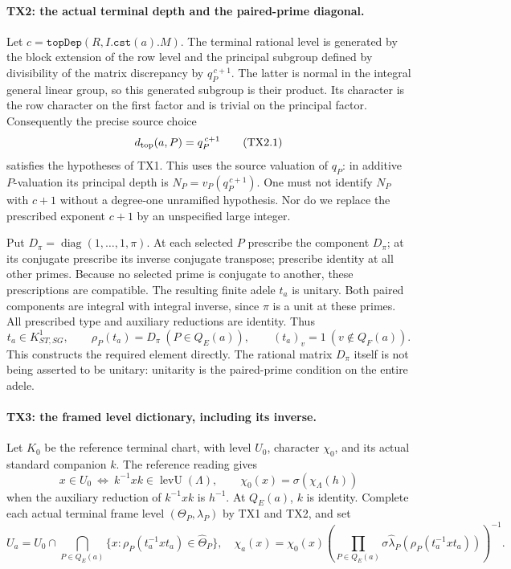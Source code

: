 \paragraph{TX2: the actual terminal depth and the paired-prime diagonal.}
Let \(c=\texttt{topDep}(R,I.\texttt{cst}(a).M)\).
The terminal rational level is generated by the block extension of
the row level and the principal subgroup defined by divisibility
of the matrix discrepancy by \(q_P^{\,c+1}\).
The latter is normal in the integral general linear group, so this
generated subgroup is their product. Its character is the row
character on the first factor and is trivial on the principal factor.
Consequently the precise source choice
\[
 d_{\rm top}(a,P)=q_P^{\,c+1}
 \tag{TX2.1}
\]
satisfies the hypotheses of TX1. This uses the source valuation of
\(q_P\): in additive \(P\)-valuation its principal depth is
\(N_P=v_P(q_P^{\,c+1})\). One must not identify \(N_P\) with
\(c+1\) without a degree-one unramified hypothesis. Nor do we
replace the prescribed exponent \(c+1\) by an unspecified large
integer.

Put \(D_\pi=\operatorname{diag}(1,\ldots,1,\pi)\). At each
selected \(P\) prescribe the component \(D_\pi\); at its conjugate
prescribe its inverse conjugate transpose; prescribe identity at all
other primes. Because no selected prime is conjugate to another, these
prescriptions are compatible. The resulting finite adele \(t_a\)
is unitary. Both paired components are integral with integral inverse,
since \(\pi\) is a unit at these primes. All prescribed type and
auxiliary reductions are identity. Thus
\[
 t_a\in K^1_{ST,SG},\qquad
 \rho_P(t_a)=D_\pi\ (P\in Q_E(a)),\qquad
 (t_a)_v=1\ (v\notin Q_F(a)).
 \tag{TX2.2}
\]
This constructs the required element directly. The rational matrix
\(D_\pi\) itself is not being asserted to be unitary: unitarity is
the paired-prime condition on the entire adele.

\paragraph{TX3: the framed level dictionary, including its inverse.}
Let \(K_0\) be the reference terminal chart, with level \(U_0\),
character \(\chi_0\), and its actual standard companion \(k\).
The reference reading gives
\[
 x\in U_0\ \Longleftrightarrow\ k^{-1}xk\in\operatorname{levU}(\Lambda),
 \qquad
 \chi_0(x)=\sigma(\chi_\Lambda(h))
 \tag{TX3.1}
\]
when the auxiliary reduction of \(k^{-1}xk\) is \(h^{-1}\).
At \(Q_E(a)\), \(k\) is identity. Complete each actual terminal
frame level \((\Theta_P,\lambda_P)\) by TX1 and TX2, and set
\[
 U_a=U_0\cap\bigcap_{P\in Q_E(a)}
 \{x:\rho_P(t_a^{-1}xt_a)\in\widehat\Theta_P\},
 \quad
 \chi_a(x)=\chi_0(x)
 \left(\prod_{P\in Q_E(a)}
       \sigma\widehat\lambda_P(\rho_P(t_a^{-1}xt_a))\right)^{-1}.
 \tag{TX3.2}
\]

